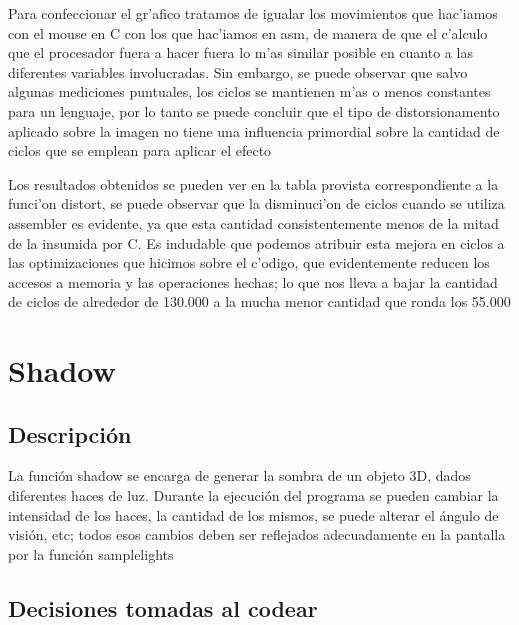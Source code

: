 \documentclass[a4paper,10pt]{article}
\begin{document}
Para confeccionar el gr'afico tratamos de igualar los movimientos que hac'iamos con el mouse en C con los que hac'iamos en asm, de manera de que el c'alculo que el procesador fuera a hacer fuera lo m'as similar posible en cuanto a las diferentes variables involucradas. Sin embargo, se puede observar que salvo algunas mediciones puntuales, los ciclos se mantienen m'as o menos constantes para un lenguaje, por lo tanto se puede concluir que el tipo de distorsionamento aplicado sobre la imagen no tiene una influencia primordial sobre la cantidad de ciclos que se emplean para aplicar el efecto

Los resultados obtenidos se pueden ver en la tabla provista correspondiente a la funci'on distort, se puede observar que la disminuci'on de ciclos cuando se utiliza assembler es evidente, ya que esta cantidad consistentemente menos de la mitad de la insumida por C. Es indudable que podemos atribuir esta mejora en ciclos a las optimizaciones que hicimos sobre el c'odigo, que evidentemente reducen los accesos a memoria y las operaciones hechas; lo que nos lleva a bajar la cantidad de ciclos de alrededor de 130.000 a la mucha menor cantidad que ronda los 55.000


\newpage

\section{Shadow}

\subsection{Descripción}

La función shadow se encarga de generar la sombra de un objeto 3D, dados diferentes haces de luz. Durante la ejecución del programa se pueden cambiar la intensidad de los haces, la cantidad de los mismos, se puede alterar el ángulo de visión, etc; todos esos cambios deben ser reflejados adecuadamente en la pantalla por la función samplelights

\subsection{Decisiones tomadas al codear}
\end{document}
